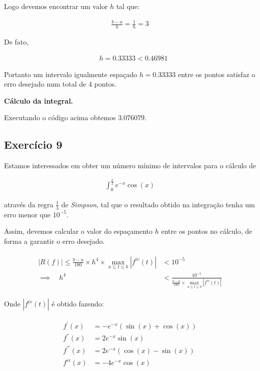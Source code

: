 \documentclass[paper=a4, fontsize=12pt]{scrartcl}
\numberwithin{equation}{section} %
\numberwithin{figure}{section} %
\numberwithin{table}{section} %
\newcommand{\euler}{e}
\begin{document}
		Logo devemos encontrar um valor $h$ tal que:

		\begin{align*}
		\frac{b - a}{h} = \frac{1}{h} = 3
		\end{align*}

		De fato,

		\begin{align*}
		\quad  h = 0.33333 < 0.46981
		\end{align*}

		Portanto um intervalo igualmente espaçado $h = 0.33333$ entre os pontos satisfaz o erro desejado num total de 4 pontos.

		\textbf{Cálculo da integral.}

		\hspace{2cm}

		


		Executando o código acima obtemos $ 3.076079 $.


		\subsection{Exercício 9}

		Estamos interessados em obter um número mínimo de intervalos para o cálculo de

		\begin{align*}
			\int_{0}^{\frac{\pi}{2}} \euler^{-x}\cos(x)
		\end{align*}

		através da regra $ \frac{1}{3} $ de \textit{Simpson}, tal que o resultado obtido na integração tenha um erro menor que $10^{-5}$.

		Assim, devemos calcular o valor do espaçamento $h$ entre os pontos no cálculo, de forma a garantir o erro desejado.

		\begin{align*}
			\begin{split}
			| R(f) | \leq \frac{b - a}{180} \times h^4 \times \max_{a \leq t \leq b} |f^{iv}(t)| & < 10^{-5}\\ \implies \quad h^4  &< \frac{10^{-5}}{\frac{b - a}{180} \times \max_{a \leq t \leq b} |f^{iv}(t)|}
			\end{split}
		\end{align*}

		Onde $|f^{iv}(t)|$ é obtido fazendo:

		\begin{align*}
			\begin{split}
			f^{'} (x) &= -\euler^{-x}(\sin(x) + \cos(x)) \\
			f^{''} (x) &= 2\euler^{-x}\sin(x)\\
			f^{'''} (x) &= 2\euler^{-x}(\cos(x) - \sin(x))\\
			f^{iv} (x) &= -4\euler^{-x}\cos(x)\\
			\end{split}
		\end{align*}
\end{document}
